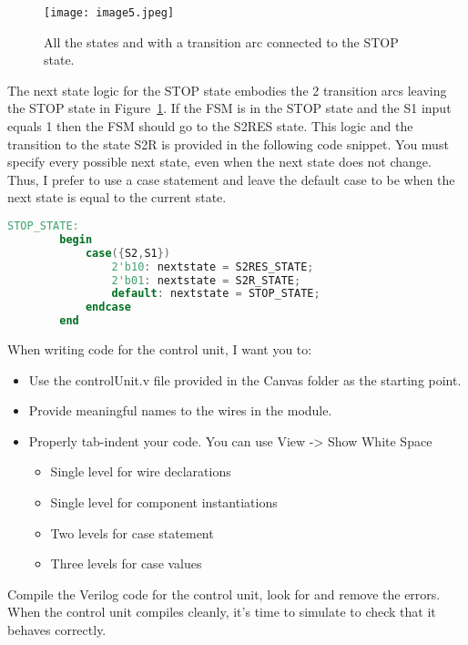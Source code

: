 \begin{figure}[ht]
\texttt{[image: image5.jpeg]}
\caption{All the states and with a transition arc connected to the STOP state.}
\label{fig:swCuStopState}
\end{figure}

The next state logic for the STOP state embodies the 2 transition arcs
leaving the STOP state in Figure~\ref{fig:swCuStopState}. If the FSM is in the STOP state and
the S1 input equals 1 then the FSM should go to the S2RES state. This
logic and the transition to the state S2R is provided in the following
code snippet. You must specify every possible next state, even when the
next state does not change. Thus, I prefer to use a case statement and
leave the default case to be when the next state is equal to the current
state.

\begin{lstlisting}[language=Verilog,  frame=single]
    STOP_STATE:
        begin
            case({S2,S1})
                2'b10: nextstate = S2RES_STATE;
                2'b01: nextstate = S2R_STATE;
                default: nextstate = STOP_STATE;
            endcase
        end
\end{lstlisting}

When writing code for the control unit, I want you to:

\begin{itemize}
\item
    Use the controlUnit.v file provided in the Canvas folder as the
    starting point.
\item
    Provide meaningful names to the wires in the module.
\item
    Properly tab-indent your code. You can use View -\textgreater{} Show
    White Space

    \begin{itemize}
        \item
            Single level for wire declarations
        \item
            Single level for component instantiations
        \item
            Two levels for case statement
        \item
            Three levels for case values
    \end{itemize}
\end{itemize}

Compile the Verilog code for the control unit, look for and remove the
errors. When the control unit compiles cleanly, it's time to simulate to
check that it behaves correctly.

